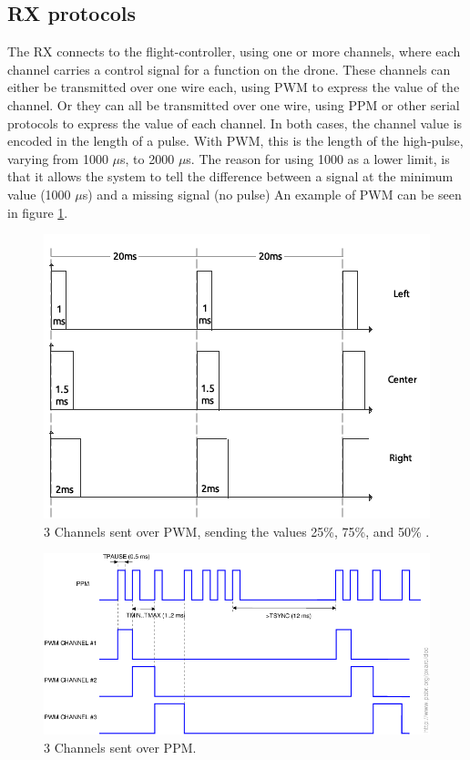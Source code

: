 \subsection*{RX protocols}\label{ss:rxprotococls} The RX connects to the flight-controller, using one or more channels, where each channel carries a control signal for a function on the drone. These channels can either be transmitted over one wire each, using PWM to express the value of the channel. Or they can all be transmitted over one wire, using PPM or other serial protocols to express the value of each channel. In both cases, the channel value is encoded in the length of a pulse. With PWM, this is the length of the high-pulse, varying from 1000 $\mu$s, to 2000 $\mu$s. The reason for using 1000 as a lower limit, is that it allows the system to tell the difference between a signal at the minimum value (1000 $\mu$s) and a missing signal (no pulse) 
An example of PWM can be seen in figure \ref{fig:chan_pwm}.

\begin{figure}[h]
    \centering
    \includegraphics[width=0.7\columnwidth]{figures/PA/servo_pwm.png}
    \caption{3 Channels sent over PWM, sending the values 25\%, 75\%, and 50\% \cite{pwm-fig}.}
    \label{fig:chan_pwm}
\end{figure}

\begin{figure}[h]
    \centering
    \includegraphics[width=0.8\columnwidth]{figures/PA/opwm_ppm.png}
    \caption{3 Channels sent over PPM. \cite{ppm-fig}}
    \label{fig:chan_ppm}
\end{figure}
  
